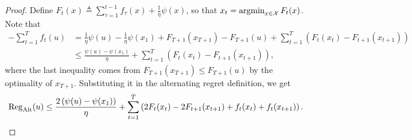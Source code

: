 \begin{proof}
    Define $F_{t}(x)\triangleq\sum_{\tau=1}^{t-1}f_\tau(x)+\frac{1}{\eta}\psi(x)$, so that $x_{t}=\operatorname*{argmin}_{x\in{\mathcal{X}}}F_{t}(x)$.
    Note that
\begin{align*}
    -\sum_{t=1}^Tf_t(u) &= \frac{1}{\eta}\psi(u) - \frac{1}{\eta}\psi(x_1)+ F_{T+1}(x_{T+1}) - F_{T+1}(u) + \sum_{t=1}^T\left(F_t(x_t)-F_{t+1}(x_{t+1})\right)  \\
    &\leq \frac{\psi(u)-\psi(x_1)}{\eta} + \sum_{t=1}^T\left(F_t(x_t)-F_{t+1}(x_{t+1})\right),
\end{align*}
where the last inequality comes from $F_{T+1}(x_{T+1})\leq F_{T+1}(u)$ by the optimality of $x_{T+1}$.
Substituting it in the alternating regret definition, we get
\begin{align}
    \mathrm{Reg}_{\mathrm{Alt}}(u) \leq  \frac{2\left(\psi(u)-\psi(x_1)\right)}{\eta} + \sum_{t=1}^T\left(2F_t(x_t)-2F_{t+1}(x_{t+1})+f_t(x_t)+f_t(x_{t+1})\right). \label{eqn:RegAlt_bound}
\end{align}


\end{proof}
